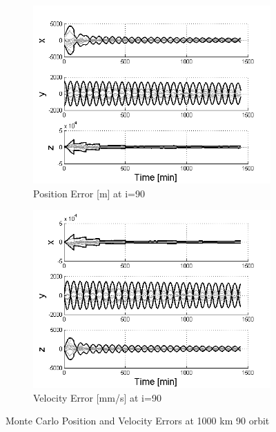 \documentclass[]{aiaa-tc}%
\begin{document}
%
\begin{figure}[ht!]
\centering
\begin{subfigure}{.5\textwidth}
  \centering
  \includegraphics[width=0.9\linewidth]{MC_pos90}
  \caption{Position Error [m] at i=90\degree}
  \label{fig:mcpos90}
\end{subfigure}%
\begin{subfigure}{.5\textwidth} 
  \centering
  \includegraphics[width=0.9\linewidth]{MC_vel90}
  \caption{Velocity Error [mm/s] at i=90\degree}
  \label{fig:coastline}
\end{subfigure}
\caption{Monte Carlo Position and Velocity Errors at 1000 km 90 \degree orbit}
\label{fig:mcvel90}
\end{figure}
%
\end{document}

